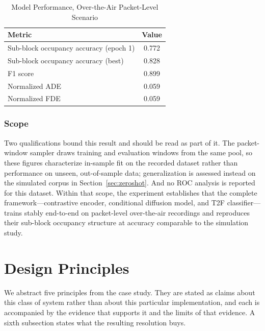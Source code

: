 \documentclass[lettersize,journal]{IEEEtran}
\begin{document}
\begin{table}[!t]
\centering
\caption{Model Performance, Over-the-Air Packet-Level Scenario}
\label{tab:ota}
\renewcommand{\arraystretch}{1.2}
\begin{tabular}{@{}lc@{}}
\toprule
\textbf{Metric} & \textbf{Value} \\
\midrule
Sub-block occupancy accuracy (epoch 1) & 0.772 \\
Sub-block occupancy accuracy (best)    & 0.828 \\
F1 score                               & 0.899 \\
Normalized ADE                         & 0.059 \\
Normalized FDE                         & 0.059 \\
\bottomrule
\end{tabular}
\end{table}

\subsubsection{\textbf{Scope}}
Two qualifications bound this result and should be read as part of it. The
packet-window sampler draws training and evaluation windows from the same pool,
so these figures characterize in-sample fit on the recorded dataset rather than 
performance on unseen, out-of-sample data; generalization is assessed instead on the simulated
corpus in Section~\ref{sec:zeroshot}. And no ROC analysis is reported for this
dataset. Within that scope, the experiment establishes that the complete
framework---contrastive encoder, conditional diffusion model, and T2F
classifier---trains stably end-to-end on packet-level over-the-air recordings
and reproduces their sub-block occupancy structure at accuracy comparable to the
simulation study.

\section{\textbf{Design Principles}}

We abstract five principles from the case study. They are stated as
claims about this class of system rather than about this particular
implementation, and each is accompanied by the evidence that supports it
and the limits of that evidence. A sixth subsection states what the
resulting resolution buys.
\end{document}

